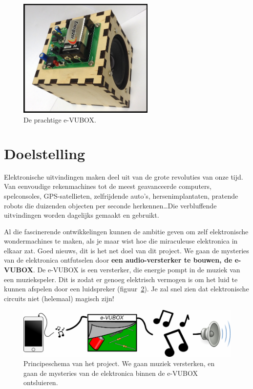 \documentclass{article}
\begin{document}
	\maketitle

	\begin{figure}[htbp]
		\centering
		\includegraphics[width=0.6\textwidth]{foto.jpg}
		\caption{De prachtige e-VUBOX.}
		\label{fig:foto}
	\end{figure}

	\clearpage
	\tableofcontents
	\clearpage
{}
	\section{Doelstelling}
		Elektronische uitvindingen maken deel uit van de grote revoluties van onze tijd. Van eenvoudige rekenmachines tot de meest geavanceerde computers, spelconsoles, GPS-satellieten, zelfrijdende auto's, hersenimplantaten, pratende robots die duizenden objecten per seconde herkennen\ldots Die verbluffende uitvindingen worden dagelijks gemaakt en gebruikt.

		Al die fascinerende ontwikkelingen kunnen de ambitie geven om zelf elektronische wondermachines te maken, als je maar wist hoe die miraculeuse elektronica in elkaar zat. Goed nieuws, dit is het net doel van dit project. We gaan de mysteries van de elektronica ontfutselen door \textbf{een audio-versterker te bouwen, de e-VUBOX}. De e-VUBOX is een versterker, die energie pompt in de muziek van een muziekspeler. Dit is zodat er genoeg elektrisch vermogen is om het luid te kunnen afspelen door een luidspreker (figuur~\ref{fig:principe}). Je zal snel zien dat elektronische circuits niet (helemaal) magisch zijn!

		\begin{figure}[htbp]
			\centering
			\includegraphics[scale=0.7]{principe}
			\caption{Principeschema van het project. We gaan muziek versterken, en gaan de mysteries van de elektronica binnen de e-VUBOX ontsluieren.}
			\label{fig:principe}
		\end{figure}
\end{document}
